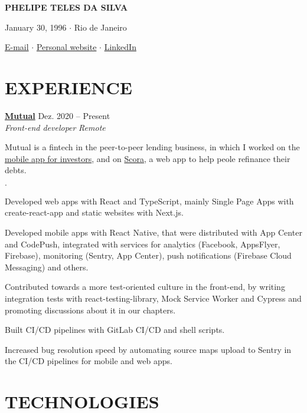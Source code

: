 \documentclass[12pt]{article}
\newenvironment{tightlist}
  {\begin{list}
    {$\cdot$}
    {
      \setlength{\leftmargin}{0em}
      \setlength{\itemsep}{\smallskipamount}
    }
  }
{\end{list}}
\begin{document}
\pagestyle{empty}

\centerline{\huge\bf PHELIPE TELES DA SILVA}
\medskip

\centerline{January 30, 1996 $\cdot$ Rio de Janeiro}
\smallskip

\centerline{
  \href{mailto:telesphelipe@gmail.com}{ E-mail}
  $\cdot$
  \href{https://phelipetls.github.io}{ Personal website}
  $\cdot$
  \href{https://linkedin.com/in/phelipeteles}{ LinkedIn}
}
\smallskip

\section*{EXPERIENCE}

\textbf{\href{https://mutual.club}{Mutual}} \hfill Dez. 2020 -- Present \\
\textit{Front-end developer} \hfill \textit{Remote} {\parfillskip=0pt\par}

Mutual is a fintech in the peer-to-peer lending business, in which I worked on
the \href{https://mutual.club/en/invest.html}{mobile app for investors}, and on
\href{https://scora.com.br/}{Scora}, a web app to help peole refinance their
debts.

\begin{tightlist}
  \item Developed web apps with React and TypeScript, mainly Single Page Apps
    with create-react-app and static websites with Next.js.
  \item Developed mobile apps with React Native, that were distributed with App
    Center and CodePush, integrated with services for analytics (Facebook,
    AppsFlyer, Firebase), monitoring (Sentry, App Center), push notifications
    (Firebase Cloud Messaging) and others.
  \item Contributed towards a more test-oriented culture in the front-end, by
    writing integration tests with react-testing-library, Mock Service Worker
    and Cypress and promoting discussions about it in our chapters.
  \item Built CI/CD pipelines with GitLab CI/CD and shell scripts.
  \item Increased bug resolution speed by automating source maps upload to
    Sentry in the CI/CD pipelines for mobile and web apps.
\end{tightlist}

\section*{TECHNOLOGIES}
\end{document}
